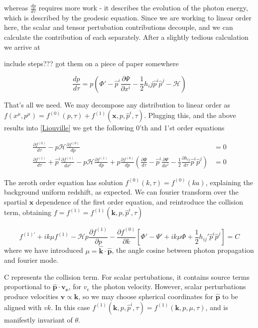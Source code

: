 \documentclass[a4paper,11pt]{article}
\renewcommand{\v}[1]{\mathbf{#1}}
\newcommand{\half}{\frac{1}{2}}
\newcommand{\unit}[1]{\hat{\v{#1}}}
\begin{document}
whereas $\frac{dp}{d\tau}$ requires more work - it describes the evolution of the photon energy, which is described by the geodesic equation. Since we are working to linear order here, the scalar and tensor pertubation contributions decouple, and we can calculate the contribution of each separately. After a slightly tedious calculation we arrive at 

include steps??? got them on a piece of paper somewhere

\begin{equation}
\frac{dp}{d\tau} = p (\Phi' - \hat{p}^i\frac{\partial \Psi}{\partial x^i} -\half h_ij\hat{p}^i\hat{p}^j -\mathcal{H})
\end{equation}

That's all we need. We may decompose any distribution to linear order as $f(x^\mu, p^\mu) = f^{(0)}(p,\tau) + f^{(1)}(\v{x},p,\hat{p}^i,\tau)$. Plugging this, and the above results into \ref{Liouville} we get the following 0'th and 1'st order equations

\begin{align}
\frac{\partial f^{(0)}}{d\tau} - p\mathcal{H}\frac{\partial f^{(0)}}{dp} &=0\\
\frac{\partial f^{(1)}}{d\tau} + \hat{p}^i\frac{\partial f^{(1)}}{dx^i} - p\mathcal{H}\frac{\partial f^{(1)}}{dp} +p\frac{\partial f^{(0)}}{dp}(\frac{\partial\Phi}{d\tau}-\hat{p}^i\frac{\partial \Psi}{dx^i}-\half \frac{\partial h_{ij}}{d\tau}\hat{p}^i\hat{p}^j) &=0
\end{align}

The zeroth order equation has solution $f^{(0)}(k,\tau) = f^{(0)}(ka)$, explaining the background uniform redshift, as expected. We can fourier transform over the spartial $\v{x}$ dependence of the first order equation, and reintroduce the collision term, obtaining $f = f^{(1)} = f^{(1)}(\v{k}, p, \hat{p}^i, \tau)$

\begin{equation}
f^{(1)'} + ik\mu f^{(1)}-\mathcal{H}p\frac{\partial f^{(1)}}{\partial p} - \frac{\partial f^{(0)}}{\partial k} [ \Phi ' - \Psi ' + ik\mu \Phi + \half h_{ij}'\hat{p}^i\hat{p}^j] = 
C
\end{equation}
where we have introduced $\mu = \unit{k} \cdot \unit{p}$, the angle cosine between photon propagation and fourier mode.

C represents the collision term. For scalar pertubations, it contains source terms proportional to $\unit{p}\cdot\v{v_e}$, for $v_e$ the photon velocity. However, scalar perturbations produce velocities $\v{v} \propto \v{k}$, so we may choose spherical coordinates for $\unit{p}$ to be aligned with $v{k}$. In this case  $f^{(1)}(\v{k}, p, \hat{p}^i, \tau) = f^{(1)}(\v{k}, p, \mu, \tau)$, and is manifestly invariant of $\theta$.
\end{document}
